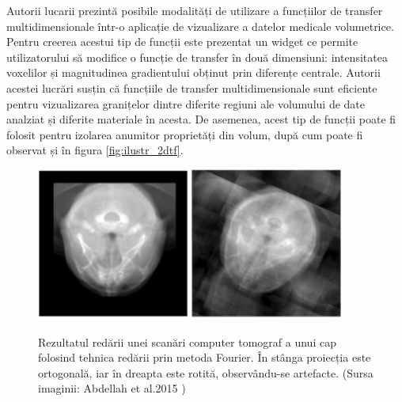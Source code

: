 Autorii lucarii \cite{kniss2002} prezintă posibile modalități de utilizare a funcțiilor de transfer multidimensionale într-o aplicație de vizualizare a datelor medicale volumetrice. Pentru creerea acestui tip de funcții este prezentat un widget ce permite utilizatorului să modifice o funcție de transfer în două dimensiuni: intensitatea voxelilor și magnitudinea gradientului obținut prin diferențe centrale. Autorii acestei lucrări susțin că funcțiile de transfer multidimensionale sunt eficiente pentru vizualizarea granițelor dintre diferite regiuni ale volumului de date analziat și diferite materiale în acesta. De asemenea, acest tip de funcții poate fi folosit pentru izolarea anumitor proprietăți din volum, după cum poate fi observat și în figura \ref{fig:ilustr_2dtf}.

\begin{figure}[!htb]
    \centering
    \includegraphics[width=5cm]{images/fvr_a.png}
    \includegraphics[width=5cm]{images/fvr_b.png}
    \\
    \caption{Rezultatul redării unei scanări computer tomograf a unui cap folosind tehnica redării prin metoda Fourier. În stânga proiecția este ortogonală, iar în dreapta este rotită, observându-se artefacte. (Sursa imaginii: Abdellah et al.2015 \cite{abdellah2015})}
    \label{fig:fvr}
\end{figure}

